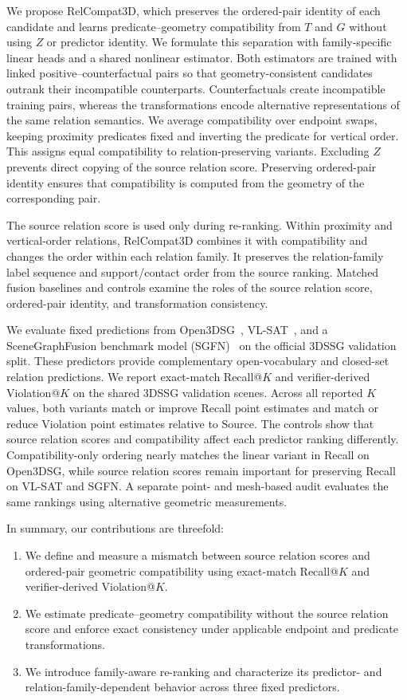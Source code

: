 We propose RelCompat3D, which preserves the ordered-pair identity of each candidate and learns predicate--geometry compatibility from $T$ and $G$ without using $Z$ or predictor identity. We formulate this separation with family-specific linear heads and a shared nonlinear estimator. Both estimators are trained with linked positive--counterfactual pairs so that geometry-consistent candidates outrank their incompatible counterparts. Counterfactuals create incompatible training pairs, whereas the transformations encode alternative representations of the same relation semantics. We average compatibility over endpoint swaps, keeping proximity predicates fixed and inverting the predicate for vertical order. This assigns equal compatibility to relation-preserving variants. Excluding $Z$ prevents direct copying of the source relation score. Preserving ordered-pair identity ensures that compatibility is computed from the geometry of the corresponding pair.

The source relation score is used only during re-ranking. Within proximity and vertical-order relations, RelCompat3D combines it with compatibility and changes the order within each relation family. It preserves the relation-family label sequence and support/contact order from the source ranking. Matched fusion baselines and controls examine the roles of the source relation score, ordered-pair identity, and transformation consistency.

We evaluate fixed predictions from Open3DSG~\cite{koch2024open3dsg}, VL-SAT~\cite{wang2023vl}, and a SceneGraphFusion benchmark model (SGFN)~\cite{wu2021scenegraphfusion} on the official 3DSSG validation split. These predictors provide complementary open-vocabulary and closed-set relation predictions. We report exact-match Recall@$K$ and verifier-derived Violation@$K$ on the shared 3DSSG validation scenes. Across all reported $K$ values, both variants match or improve Recall point estimates and match or reduce Violation point estimates relative to Source. The controls show that source relation scores and compatibility affect each predictor ranking differently. Compatibility-only ordering nearly matches the linear variant in Recall on Open3DSG, while source relation scores remain important for preserving Recall on VL-SAT and SGFN. A separate point- and mesh-based audit evaluates the same rankings using alternative geometric measurements.

In summary, our contributions are threefold:
\begin{enumerate}
    \item We define and measure a mismatch between source relation scores and ordered-pair geometric compatibility using exact-match Recall@$K$ and verifier-derived Violation@$K$.
    \item We estimate predicate--geometry compatibility without the source relation score and enforce exact consistency under applicable endpoint and predicate transformations.
    \item We introduce family-aware re-ranking and characterize its predictor- and relation-family-dependent behavior across three fixed predictors.
\end{enumerate}